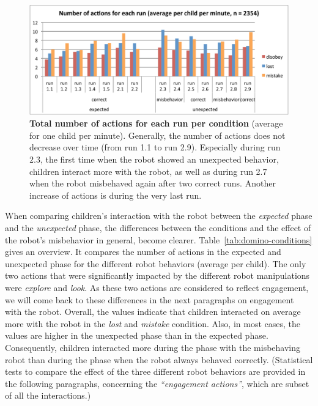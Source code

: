 \documentclass{sig-alternate}
\begin{document}
\begin{figure}[!h] 
\centering 
\includegraphics[width=0.9\columnwidth]{domino-actions-perrun.pdf} 
\caption[Total Number of Actions for Each Run per Condition]{\small \textbf{Total number of actions for each run per condition} (average for one child per minute). Generally, the number of actions does not decrease over time (from run 1.1 to run 2.9). Especially during run 2.3, the first time when the robot showed an unexpected behavior, children interact more with the robot, as well as during run 2.7 when the robot misbehaved again after two correct runs. Another increase of actions is during the very last run.}
\label{fig:domino-time-condition-one} 
\end{figure}		
 

When comparing children's interaction with the robot between the
\textit{expected} phase and the \textit{unexpected} phase, the differences
between the conditions and the effect of the robot's misbehavior in general,
become clearer. Table~\ref{tab:domino-conditions} gives an overview. It compares
the number of actions in the expected and unexpected phase for the different
robot behaviors (average per child). The only two actions that were
significantly impacted by the different robot manipulations were
\textit{explore} and \textit{look}. As these two actions are considered to
reflect engagement, we will come back to these differences in the next
paragraphs on engagement with the robot. Overall, the values indicate that
children interacted on average more with the robot in the \textit{lost} and
\textit{mistake} condition. Also, in most cases, the values are higher in the
unexpected phase than in the expected phase. Consequently, children interacted
more during the phase with the misbehaving robot than during the phase when the
robot always behaved correctly. (Statistical tests to compare the effect of the
three different robot behaviors are provided in the following paragraphs,
concerning the \textit{``engagement actions''}, which are subset of all the
interactions.)
\end{document}
